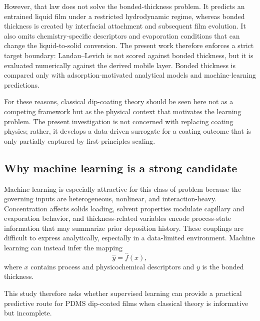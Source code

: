 \documentclass[11pt]{article}
\begin{document}
However, that law does not solve the bonded-thickness problem. It predicts an entrained liquid film under a restricted hydrodynamic regime, whereas bonded thickness is created by interfacial attachment and subsequent film evolution. It also omits chemistry-specific descriptors and evaporation conditions that can change the liquid-to-solid conversion. The present work therefore enforces a strict target boundary: Landau--Levich is not scored against bonded thickness, but it is evaluated numerically against the derived mobile layer. Bonded thickness is compared only with adsorption-motivated analytical models and machine-learning predictions.

For these reasons, classical dip-coating theory should be seen here not as a competing framework but as the physical context that motivates the learning problem. The present investigation is not concerned with replacing coating physics; rather, it develops a data-driven surrogate for a coating outcome that is only partially captured by first-principles scaling.

\subsection{Why machine learning is a strong candidate}
Machine learning is especially attractive for this class of problem because the governing inputs are heterogeneous, nonlinear, and interaction-heavy. Concentration affects solids loading, solvent properties modulate capillary and evaporation behavior, and thickness-related variables encode process-state information that may summarize prior deposition history. These couplings are difficult to express analytically, especially in a data-limited environment. Machine learning can instead infer the mapping
\begin{equation}
\hat{y} = \hat{f}(x),
\end{equation}
where $x$ contains process and physicochemical descriptors and $y$ is the bonded thickness.

This study therefore asks whether supervised learning can provide a practical predictive route for PDMS dip-coated films when classical theory is informative but incomplete.
\end{document}

